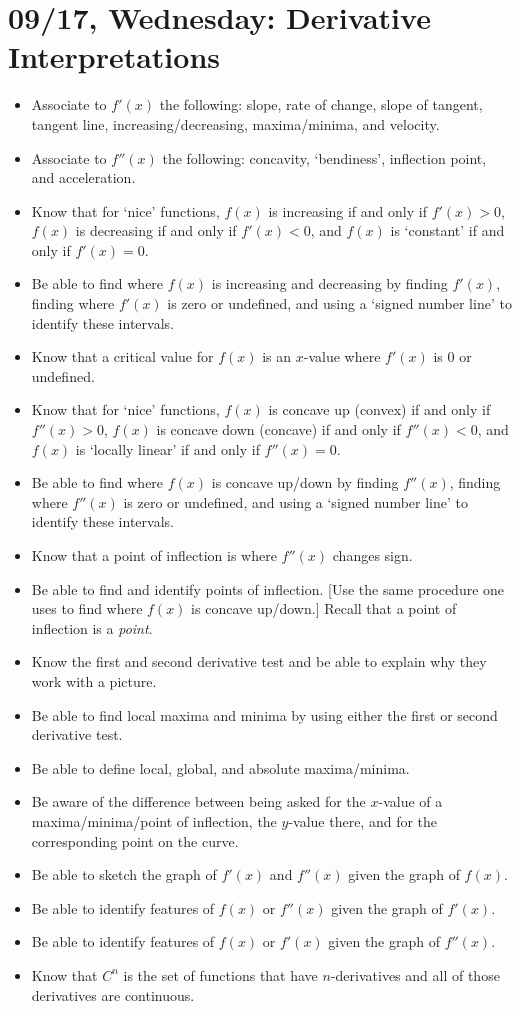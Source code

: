 \documentclass[11pt,letterpaper]{article}
\begin{document}
\newpage
\section*{09/17, Wednesday: Derivative Interpretations\label{09-17}}

\begin{itemize}
\item Associate to $f'(x)$ the following: slope, rate of change, slope of tangent, tangent line, increasing/decreasing, maxima/minima, and velocity. 
\item Associate to $f''(x)$ the following: concavity, `bendiness', inflection point, and acceleration.
\item Know that for `nice' functions, $f(x)$ is increasing if and only if $f'(x) > 0$, $f(x)$ is decreasing if and only if $f'(x) < 0$, and $f(x)$ is `constant' if and only if $f'(x)= 0$. 
\item Be able to find where $f(x)$ is increasing and decreasing by finding $f'(x)$, finding where $f'(x)$ is zero or undefined, and using a `signed number line' to identify these intervals. 
\item Know that a critical value for $f(x)$ is an $x$-value where $f'(x)$ is 0 or undefined. 
\item Know that for `nice' functions, $f(x)$ is concave up (convex) if and only if $f''(x) > 0$, $f(x)$ is concave down (concave) if and only if $f''(x) < 0$, and $f(x)$ is `locally linear' if and only if $f''(x)= 0$.
\item Be able to find where $f(x)$ is concave up/down by finding $f''(x)$, finding where $f''(x)$ is zero or undefined, and using a `signed number line' to identify these intervals. 
\item Know that a point of inflection is where $f''(x)$ changes sign. 
\item Be able to find and identify points of inflection. [Use the same procedure one uses to find where $f(x)$ is concave up/down.] Recall that a point of inflection is a \textit{point}. 
\item Know the first and second derivative test and be able to explain why they work with a picture. 
\item Be able to find local maxima and minima by using either the first or second derivative test. 
\item Be able to define local, global, and absolute maxima/minima. 
\item Be aware of the difference between being asked for the $x$-value of a maxima/minima/point of inflection, the $y$-value there, and for the corresponding point on the curve. 
\item Be able to sketch the graph of $f'(x)$ and $f''(x)$ given the graph of $f(x)$. 
\item Be able to identify features of $f(x)$ or $f''(x)$ given the graph of $f'(x)$.
\item Be able to identify features of $f(x)$ or $f'(x)$ given the graph of $f''(x)$.
\item Know that $C^n$ is the set of functions that have $n$-derivatives and all of those derivatives are continuous. 
\end{itemize}
\end{document}
